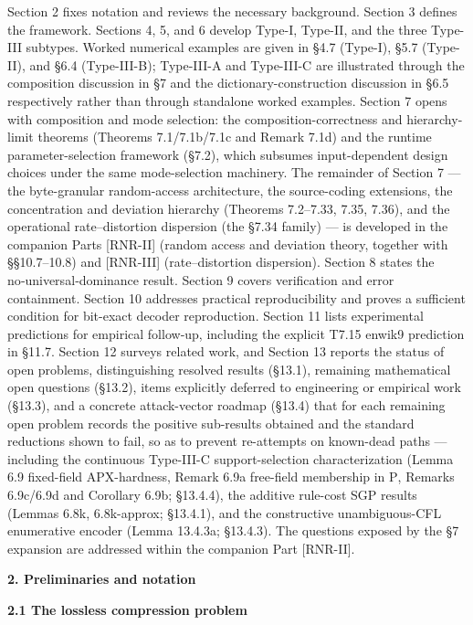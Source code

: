 \documentclass[
]{article}
\begin{document}
Section 2 fixes notation and reviews the necessary background. Section 3
defines the framework. Sections 4, 5, and 6 develop Type-I, Type-II,
and the three Type-III subtypes. Worked numerical examples are given
in §4.7 (Type-I), §5.7 (Type-II), and §6.4 (Type-III-B); Type-III-A
and Type-III-C are illustrated through the composition discussion in
§7 and the dictionary-construction discussion in §6.5 respectively
rather than through standalone worked examples. Section 7 opens with composition and mode selection: the composition-correctness and hierarchy-limit theorems (Theorems 7.1/7.1b/7.1c and Remark 7.1d) and the runtime parameter-selection framework (§7.2), which subsumes input-dependent design choices under the same mode-selection machinery. The remainder of Section 7 --- the byte-granular random-access architecture, the source-coding extensions, the concentration and deviation hierarchy (Theorems 7.2--7.33, 7.35, 7.36), and the operational rate--distortion dispersion (the §7.34 family) --- is developed in the companion Parts [RNR-II] (random access and deviation theory, together with §§10.7--10.8) and [RNR-III] (rate--distortion dispersion). Section 8 states the
no‑universal‑dominance result. Section 9 covers verification and error
containment. Section 10 addresses practical reproducibility and proves a
sufficient condition for bit-exact decoder reproduction. Section 11
lists experimental predictions for empirical follow‑up, including the
explicit T7.15 enwik9 prediction in §11.7. Section 12 surveys related
work, and Section 13 reports the status of open problems, distinguishing
resolved results (§13.1), remaining mathematical open questions (§13.2),
items explicitly deferred to engineering or empirical work (§13.3), and
a concrete attack-vector roadmap (§13.4) that for each remaining open
problem records the positive sub-results obtained and the standard
reductions shown to fail, so as to prevent re-attempts on known-dead
paths --- including the continuous Type-III-C support-selection
characterization (Lemma 6.9 fixed-field APX-hardness, Remark 6.9a
free-field membership in $\mathrm{P}$, Remarks 6.9c/6.9d and
Corollary 6.9b; §13.4.4), the additive rule-cost SGP results
(Lemmas 6.8k, 6.8k-approx; §13.4.1), and the constructive
unambiguous-CFL enumerative encoder (Lemma 13.4.3a; §13.4.3). The questions exposed by the §7 expansion are addressed within the companion Part [RNR-II].

\textbf{2. Preliminaries and notation}

\textbf{2.1 The lossless compression problem}
\end{document}
